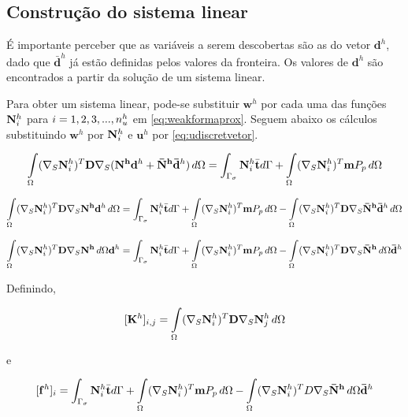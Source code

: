 \subsection{Construção do sistema linear}

É importante perceber que as variáveis a serem descobertas são as do vetor $\mathbf{d}^h$, dado que $\mathbf{\bar{d}}^h$ já estão definidas pelos valores da fronteira. Os valores de $\mathbf{d}^h$ são encontrados a partir da solução de um sistema linear.

Para obter um sistema linear, pode-se substituir $\mathbf{w}^h$ por cada uma das funções ${\mathbf{N}_{i}^h}$ para $i = 1, 2, 3, ..., n_u^h$ em \eqref{eq:weakformaprox}. Seguem abaixo os cálculos substituindo $\mathbf{w}^h$ por ${\mathbf{N}_{i}^h}$ e $\mathbf{u}^h$ por \eqref{eq:udiscretvetor}.


\begin{equation}
\int\limits_{\Omega}  (\nabla_S {\mathbf{N}_{i}^h})^T \mathbf{D}\nabla_S (\mathbf{N^h} \mathbf{d}^h + \mathbf{\bar{N}^h} \mathbf{\bar{d}}^h ) \, d\Omega = \int_{\Gamma_\sigma} {\mathbf{N}_{i}^h} \bar{\mathbf{t}} d\Gamma + \int\limits_{\Omega} (\nabla_S {\mathbf{N}_{i}^h})^T \mathbf{m} P_p \, d\Omega
\end{equation}

\begin{equation*}
\int\limits_{\Omega}  (\nabla_S {\mathbf{N}_{i}^h})^T \mathbf{D}\nabla_S \mathbf{N^h} \mathbf{d}^h  \, d\Omega  = \int_{\Gamma_\sigma} {\mathbf{N}_{i}^h} \bar{\mathbf{t}} d\Gamma + \int\limits_{\Omega} (\nabla_S {\mathbf{N}_{i}^h})^T \mathbf{m} P_p \, d\Omega - \int\limits_{\Omega}  (\nabla_S {\mathbf{N}_{i}^h})^T \mathbf{D}\nabla_S  \mathbf{\bar{N}^h} \mathbf{\bar{d}}^h \, d\Omega
\end{equation*}

\begin{equation}\label{eq:umaequacaosistema}
\int\limits_{\Omega}  (\nabla_S {\mathbf{N}_{i}^h})^T \mathbf{D}\nabla_S \mathbf{N^h} \, d\Omega  \mathbf{d}^h   = \int_{\Gamma_\sigma} {\mathbf{N}_{i}^h} \bar{\mathbf{t}} d\Gamma + \int\limits_{\Omega} (\nabla_S {\mathbf{N}_{i}^h})^T \mathbf{m} P_p \, d\Omega - \int\limits_{\Omega}  (\nabla_S {\mathbf{N}_{i}^h})^T \mathbf{D}\nabla_S  \mathbf{\bar{N}^h}  \, d\Omega \mathbf{\bar{d}}^h
\end{equation}


Definindo,

\begin{equation}\label{eq:entradamatriz}
    [\mathbf{K}^h]_{i,j} = \int\limits_{\Omega} (\nabla_S {\mathbf{N}_{i}^h})^T \mathbf{D} \nabla_S {\mathbf{N}_{j}^h} \, d\Omega 
\end{equation}

e

\begin{equation}\label{eq:entradald}
    [\mathbf{f}^h]_i = \int_{\Gamma_\sigma} {\mathbf{N}_{i}^h} \bar{\mathbf{t}} d\Gamma + \int\limits_{\Omega} (\nabla_S {\mathbf{N}_{i}^h})^T \mathbf{m} P_p \, d\Omega - \int\limits_{\Omega}  (\nabla_S {\mathbf{N}_{i}^h})^T D \nabla_S  \mathbf{\bar{N}^h}  \, d\Omega \mathbf{\bar{d}}^h
\end{equation}



